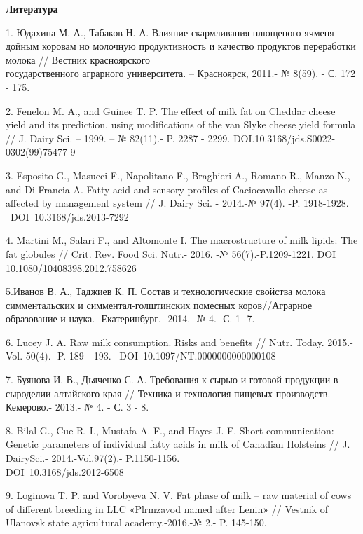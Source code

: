 \begin{center}
  {\bfseries Литература}
  \end{center}

\begin{noparindent}

1. Юдахина М. А., Табаков Н. А. Влияние скармливания плющеного ячменя
дойным коровам но молочную продуктивность и качество продуктов
переработки молока // Вестник красноярского \\государственного аграрного
университета. -- Красноярск, 2011.- № 8(59). - С. 172 - 175.

2. Fenelon M. A., and Guinee T. P. The effect of milk fat on Cheddar
cheese yield and its prediction, using modifications of the van Slyke
cheese yield formula // J. Dairy Sci. -- 1999. -- № 82(11).- P. 2287 -
2299. DOI.10.3168/jds.S0022-0302(99)75477-9

3. Esposito G., Masucci F., Napolitano F., Braghieri A., Romano R.,
Manzo N., and Di Francia A. Fatty acid and sensory profiles of
Caciocavallo cheese as affected by management system // J. Dairy Sci. -
2014.-№ 97(4). -P. 1918-1928. ~DOI~10.3168/jds.2013-7292

4. Martini M., Salari F., and Altomonte I. The macrostructure of milk
lipids: The fat globules // Crit. Rev. Food Sci. Nutr.- 2016. -№
56(7).-P.1209-1221. DOI 10.1080/10408398.2012.758626

5.Иванов В. А., Таджиев К. П. Состав и технологические свойства молока
симментальских и симментал-голштинских помесных коров//Аграрное
образование и наука.- Екатеринбург.- 2014.- № 4.- С. 1 -7.

6. Lucey J. A. Raw milk consumption. Risks and benefits // Nutr. Today.
2015.-Vol. 50(4).- P. 189---193. ~DOI~10.1097/NT.0000000000000108

7. Буянова И. В., Дьяченко С. А. Требования к сырью и готовой продукции
в сыроделии алтайского края // Техника и технология пищевых производств.
--Кемерово.- 2013.- № 4. - С. 3 - 8.

8. Bilal G., Cue R. I., Mustafa A. F., and Hayes J. F. Short
communication: Genetic parameters of individual fatty acids in milk of
Canadian Holsteins // J. DairySci.- 2014.-Vol.97(2).- P.1150-1156.
\\DOI~10.3168/jds.2012-6508

9. Loginova T. P. and Vorobyeva N. V. Fat phase of milk -- raw material
of cows of different breeding in LLC «Plrmzavod named after Lenin» //
Vestnik of Ulanovsk state agricultural academy.-2016.-№ 2.- P. 145-150.


\end{noparindent}
